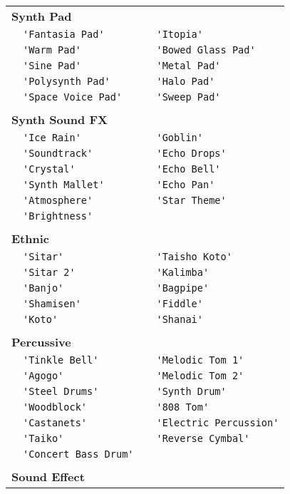 \documentclass{article}
\newcommand{\instrusection}[1]{ \\[5pt] \multicolumn{4}{l}{\textbf{#1}}\\}
\newcommand\lvlo{}
\newcommand\lvlt{\ding{105}}
\begin{document}
\begin{center}
\begin{longtable}{ll|ll}
\instrusection{Synth Pad}
 \lvlo & \lstinline!'Fantasia Pad'! & \lvlt & \lstinline!'Itopia'! \\
 \lvlo & \lstinline!'Warm Pad'! & \lvlo & \lstinline!'Bowed Glass Pad'! \\
 \lvlt & \lstinline!'Sine Pad'! & \lvlo & \lstinline!'Metal Pad'! \\
 \lvlo & \lstinline!'Polysynth Pad'! & \lvlo & \lstinline!'Halo Pad'! \\
 \lvlo & \lstinline!'Space Voice Pad'! & \lvlo & \lstinline!'Sweep Pad'! \\
\instrusection{Synth Sound FX}
 \lvlo & \lstinline!'Ice Rain'! & \lvlo & \lstinline!'Goblin'! \\
 \lvlo & \lstinline!'Soundtrack'! & \lvlo & \lstinline!'Echo Drops'! \\
 \lvlo & \lstinline!'Crystal'! & \lvlt & \lstinline!'Echo Bell'! \\
 \lvlt & \lstinline!'Synth Mallet'! & \lvlt & \lstinline!'Echo Pan'! \\
 \lvlo & \lstinline!'Atmosphere'! & \lvlo & \lstinline!'Star Theme'! \\
 \lvlo & \lstinline!'Brightness'! \\
\instrusection{Ethnic}
 \lvlo & \lstinline!'Sitar'! & \lvlt & \lstinline!'Taisho Koto'! \\
 \lvlt & \lstinline!'Sitar 2'! & \lvlo & \lstinline!'Kalimba'! \\
 \lvlo & \lstinline!'Banjo'! & \lvlo & \lstinline!'Bagpipe'! \\
 \lvlo & \lstinline!'Shamisen'! & \lvlo & \lstinline!'Fiddle'! \\
 \lvlo & \lstinline!'Koto'! & \lvlo & \lstinline!'Shanai'! \\
\instrusection{Percussive}
 \lvlo & \lstinline!'Tinkle Bell'! & \lvlo & \lstinline!'Melodic Tom 1'! \\
 \lvlo & \lstinline!'Agogo'! & \lvlt & \lstinline!'Melodic Tom 2'! \\
 \lvlo & \lstinline!'Steel Drums'! & \lvlo & \lstinline!'Synth Drum'! \\
 \lvlo & \lstinline!'Woodblock'! & \lvlt & \lstinline!'808 Tom'! \\
 \lvlt & \lstinline!'Castanets'! & \lvlt & \lstinline!'Electric Percussion'! \\
 \lvlo & \lstinline!'Taiko'! & \lvlo & \lstinline!'Reverse Cymbal'! \\
 \lvlt & \lstinline!'Concert Bass Drum'! \\
\instrusection{Sound Effect}

\end{longtable}
\end{center}
\end{document}
